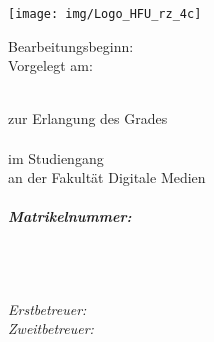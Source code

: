 
\begin{titlepage}
	\thispagestyle{empty}
{
\selectfont %

	\texttt{[image: img/Logo\_HFU\_rz\_4c]}
	\vspace{30pt}
		\begin{flushright}
			Bearbeitungsbeginn:  \bearbeitungsbeginn\\
			Vorgelegt am:  \vorlagedatum\\
		\end{flushright}
	
	\enlargethispage{20mm}
	\vspace{35pt}
	{ \huge \textbf \artderarbeit \\[0.5em]}
	{ \large zur Erlangung des Grades \\[0.5em]}
		{\large \textbf \grad \\[0.5em]}
		{\large im Studiengang \studiengang \\[0.5em]}
		{\large an der Fakultät Digitale Medien   \\[5em]}
		\noindent
		{  \Large \textit{ \textbf{ \studentname  } } \\ [0.75em]}
		{ \large \textit{ \textbf{ Matrikelnummer: \studentnr} } \\ [1em]}
		\\
		\\
		{\Large \textbf \titel \\[1.5em]}

		\vspace{50pt}	
		
		{\fontsize{18pt}{27pt} \textit{ Erstbetreuer: \hspace{70pt} \erstbetreuer } \\[1em]}
		{\fontsize{18pt}{27pt} \textit{ Zweitbetreuer: \hspace{70pt}\zweitbetreuer } \\}
}
\end{titlepage}

\cleardoubleemptypage
